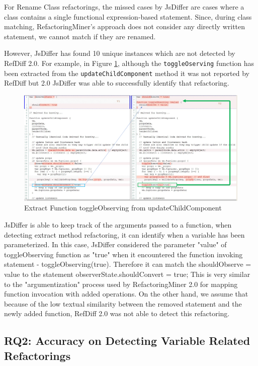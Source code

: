 \documentclass[letterpaper,12pt,onecolumn,final]{report}
\begin{document}
For Rename Class refactorings, the missed cases by JsDiffer are cases where a class contains a single functional expression-based statement. Since, during class matching, RefactoringMiner's approach does not consider any directly written statement, we cannot match if they are renamed.


However, JsDiffer has found 10 unique instances which are not detected by RefDiff 2.0. For example, in Figure \ref{fig:extractToggle}, although the \texttt{toggleOserving} function has been extracted from the \texttt{updateChildComponent} method it was not reported by RefDiff but 2.0 JsDiffer was able to successfully identify that refactoring.

\begin{figure}
\includegraphics[width=\textwidth,height=\textheight,keepaspectratio]{extracttoggleObserving}
  \caption{Extract Function toggleObserving from updateChildComponent}
   \label{fig:extractToggle}
\end{figure}

JsDiffer is able to keep track of the arguments passed to a function, when detecting extract method refactoring, it can identify when a variable has been parameterized. In this case, JsDiffer considered the parameter "value" of toggleObserving function as "true" when it encountered the function invoking statement - toggleObserving(true). Therefore it can match the shouldObserve = value to the statement observerState.shouldConvert = true; This is very similar to the "argumentization" process used by RefactoringMiner 2.0 for mapping function invocation with added operations. On the other hand, we assume that because of the low textual similarity between the removed statement and the newly added function, RefDiff 2.0 was not able to detect this refactoring.

\subsection{RQ2: Accuracy on Detecting Variable Related Refactorings}
\end{document}
